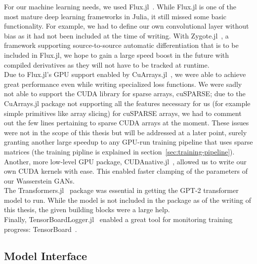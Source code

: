 For our machine learning needs, we used
\mbox{Flux.jl}~\cite{FluxMLFluxJl2019}. While \mbox{Flux.jl} is one of
the most mature deep learning frameworks in Julia, it still missed
some basic functionality. For example, we had to define our own
convolutional layer without bias as it had not been included at the
time of writing. With \mbox{Zygote.jl}~\cite{FluxMLZygoteJl2019}, a
framework supporting source-to-source automatic differentiation that
is to be included in \mbox{Flux.jl}, we hope to gain a large speed
boost in the future with compiled derivatives as they will not have to
be tracked at runtime. \\
Due to \mbox{Flux.jl}'s GPU support enabled by
\mbox{CuArrays.jl}~\cite{JuliaGPUCuArraysJl2019}, we were able to
achieve great performance even while writing specialized loss
functions. We were sadly not able to support the CUDA library for
sparse arrays, cuSPARSE; due to the \mbox{CuArrays.jl} package not
supporting all the features necessary for us (for example simple
primitives like array slicing) for cuSPARSE arrays, we had to comment
out the few lines pertaining to sparse CUDA arrays at the moment.
These issues were not in the scope of this thesis but will be
addressed at a later point, surely granting another large speedup to
any GPU-run training pipeline that uses sparse matrices (the training
pipline is explained in section~\ref{sec:training-pipeline}). Another,
more low-level GPU package,
\mbox{CUDAnative.jl}~\cite{JuliaGPUCUDAnativeJl2019}, allowed us to
write our own CUDA kernels with ease. This enabled faster clamping of
the parameters of our Wasserstein GANs. \\
The \mbox{Transformers.jl}~\cite{peterChengchingwenTransformersJl2019}
package was essential in getting the \mbox{GPT-2} transformer model to
run. While the model is not included in the package as of the writing
of this thesis, the given building blocks were a large help. \\
Finally,
\mbox{TensorBoardLogger.jl}~\cite{vicentiniPhilipVincTensorBoardLoggerJl2019}
enabled a great tool for monitoring training progress:
TensorBoard~\cite{TensorBoard}.

\subsection{Model Interface}
\label{sec:model-interface}

